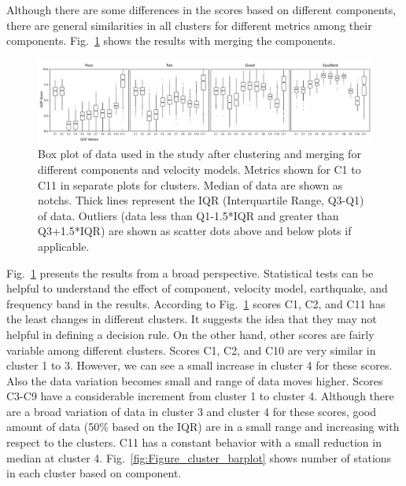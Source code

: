 Although there are some differences in the scores based on different components, there are general similarities in all clusters for different metrics among their components. Fig.~\ref{fig:Figure_cluster_all_comp} shows the results with merging the components. 

\begin{figure}
    \centering
    \includegraphics[width=\textwidth]{figures/pdf/Figure_8.pdf}
    \caption{Box plot of data used in the study after clustering and merging for different components and velocity models. Metrics shown for C1 to C11  in separate plots for  clusters. Median of data are shown as notchs. Thick lines represent the IQR (Interquartile Range, Q3-Q1) of data. Outliers (data less than Q1-1.5*IQR and greater than Q3+1.5*IQR) are shown as scatter dots above and below plots if applicable.}
    \label{fig:Figure_cluster_all_comp}
\end{figure}

Fig.~\ref{fig:Figure_cluster_all_comp} presents the results from a broad perspective. Statistical tests can be helpful to understand the effect of component, velocity model, earthquake, and frequency band in the results.  According to Fig.~\ref{fig:Figure_cluster_all_comp} scores C1, C2, and C11 has the least changes in different clusters. It suggests the idea that they may not helpful in defining a decision rule. On the other hand, other scores are fairly variable among different clusters. 
Scores C1, C2, and C10 are very similar in cluster 1 to 3. However, we can see a small increase in cluster 4 for these scores. Also the data variation becomes small and range of data moves higher. Scores C3-C9 have a considerable increment from cluster 1 to cluster 4. Although there are a broad variation of data in cluster 3 and cluster 4 for these scores, good amount of data (50\% based on the IQR) are in a small range and increasing with respect to the clusters. C11 has a constant behavior with a small reduction in median at cluster 4. Fig.~\ref{fig:Figure_cluster_barplot} shows number of stations in each cluster based on component. 


